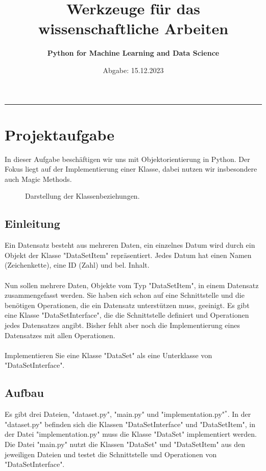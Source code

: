 \documentclass[a4paper,11pt]{article}
\title{\textbf{Werkzeuge für das wissenschaftliche Arbeiten}}
\author{\textbf{Python for Machine Learning and Data Science}}
\date{Abgabe: 15.12.2023}
\begin{document}
\maketitle
\hrule

\tableofcontents
\newpage

\section{Projektaufgabe}
In dieser Aufgabe beschäftigen wir uns mit Objektorientierung in Python.
Der Fokus liegt auf der Implementierung einer Klasse, dabei nutzen wir insbesondere auch Magic Methods.
\\
\begin{figure}[htbp]
  \centering
  \def\svgscale{1.3}
  
  \caption{Darstellung der Klassenbeziehungen.}
\end{figure}

\subsection{Einleitung}
Ein Datensatz besteht aus mehreren Daten, ein einzelnes Datum wird durch ein Objekt der Klasse "DataSetItem" repräsentiert. Jedes Datum hat einen Namen (Zeichenkette), eine ID (Zahl) und bel. Inhalt. \\
\\
Nun sollen mehrere Daten, Objekte vom Typ "DataSetItem", in einem Datensatz zusammengefasst werden.
Sie haben sich schon auf eine Schnittstelle und die benötigen Operationen, die ein Datensatz unterstützen muss, geeinigt. Es gibt eine Klasse "DataSetInterface", die die Schnittstelle definiert und Operationen jedes Datensatzes angibt. Bisher fehlt aber noch die Implementierung eines Datensatzes mit allen Operationen. \\
\\
Implementieren Sie eine Klasse "DataSet" als eine Unterklasse von "DataSetInterface".

\subsection{Aufbau}
Es gibt drei Dateien, "dataset.py", "main.py" und "implementation.py"$^*$.
In der "dataset.py" befinden sich die Klassen "DataSetInterface" und "DataSetItem",
in der Datei "implementation.py" muss die Klasse "DataSet" implementiert werden.
Die Datei "main.py" nutzt die Klassen "DataSet" und "DataSetItem" aus den jeweiligen Dateien und testet die Schnittstelle und Operationen von "DataSetInterface".
\end{document}
